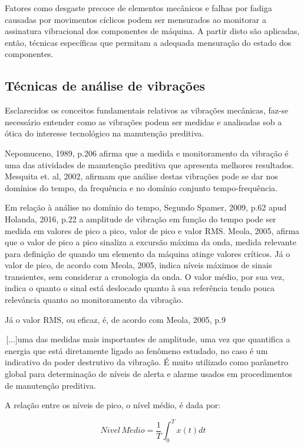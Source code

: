 \documentclass[
	12pt,				
	oneside,			
	a4paper,			
	english,			
	brazil				
	]{abntex2ppgsi}
\begin{document}
Fatores como desgaste precoce de elementos mecânicos e falhas por fadiga causadas por movimentos cíclicos podem ser mensurados ao monitorar a assinatura vibracional dos componentes de máquina. A partir disto são aplicadas, então, técnicas específicas que permitam a adequada mensuração do estado dos componentes. 


\subsection{\textbf{Técnicas de análise de vibrações}}

Esclarecidos os conceitos  fundamentais relativos as vibrações mecânicas, faz-se necessário entender como as vibrações podem ser medidas e analisadas sob a ótica do interesse tecnológico na manutenção preditiva. 

Nepomuceno, 1989, p.206 afirma que a medida e monitoramento da vibração é uma das atividades de manutenção preditiva que apresenta melhores resultados. Mesquita et. al, 2002, afirmam que análise destas vibrações pode se dar nos domínios do tempo, da frequência e no domínio conjunto tempo-frequência.

Em relação à análise no domínio do tempo, Segundo Spamer, 2009, p.62 apud Holanda, 2016, p.22 a amplitude de vibração em função do tempo pode ser medida em valores de pico a pico, valor de pico e valor RMS. Meola, 2005, afirma que o valor de pico a pico sinaliza a excursão máxima da onda, medida relevante para definição de quando um elemento da máquina atinge valores críticos. Já o valor de pico, de acordo com Meola, 2005, indica níveis máximos de sinais transientes, sem considerar a cronologia da onda. O valor médio, por sua vez, indica o quanto o sinal está deslocado quanto à sua referência tendo pouca relevância quanto ao monitoramento da vibração. 

Já o valor RMS, ou eficaz, é, de acordo com Meola, 2005, p.9

\begin{citacao}
\,[...]uma das medidas mais importantes de amplitude, uma vez que quantifica a energia que está diretamente ligado ao fenômeno estudado, no caso é um indicativo do poder destrutivo da vibração. É muito utilizado como parâmetro global para determinação de níveis de alerta e alarme usados em procedimentos de manutenção preditiva.
\end{citacao}

A relação entre os níveis de pico, o nível médio, é dada por:

\[Nivel \, M\acute{e}dio = \frac{1}{T} \int_{0}^{T} x(t)dt \]
\end{document}
